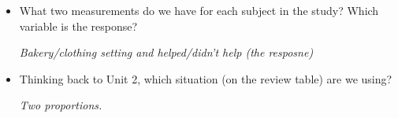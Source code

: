 \begin{itemize}
\item What two measurements do we have for each subject in the study?
  Which variable is the response?  
\begin{students}
 \vspace{.8cm}
\end{students}

\begin{key}
 {\it Bakery/clothing setting and helped/didn't help (the resposne)}
\end{key}

\item Thinking back to Unit 2, which situation (on the review table)
  are we using?
\begin{students}
 \vspace{.8cm}
\end{students}

\begin{key}
 {\it Two proportions.}
\end{key}




\end{itemize}




